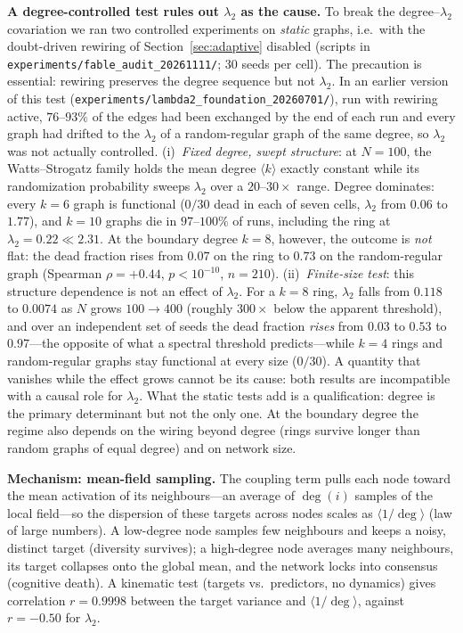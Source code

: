 ﻿\documentclass[11pt]{article}
\begin{document}
\textbf{A degree-controlled test rules out $\lambda_2$ as the cause.} To break the degree--$\lambda_2$ covariation we ran two controlled experiments on \emph{static} graphs, i.e.\ with the doubt-driven rewiring of Section~\ref{sec:adaptive} disabled (scripts in \texttt{experiments/fable\_audit\_20261111/}; 30 seeds per cell). The precaution is essential: rewiring preserves the degree sequence but not $\lambda_2$. In an earlier version of this test (\texttt{experiments/lambda2\_foundation\_20260701/}), run with rewiring active, $76$--$93\%$ of the edges had been exchanged by the end of each run and every graph had drifted to the $\lambda_2$ of a random-regular graph of the same degree, so $\lambda_2$ was not actually controlled. (i)~\emph{Fixed degree, swept structure}: at $N = 100$, the Watts--Strogatz family holds the mean degree $\langle k\rangle$ exactly constant while its randomization probability sweeps $\lambda_2$ over a $20$--$30\times$ range. Degree dominates: every $k=6$ graph is functional ($0/30$ dead in each of seven cells, $\lambda_2$ from $0.06$ to $1.77$), and $k=10$ graphs die in $97$--$100\%$ of runs, including the ring at $\lambda_2 = 0.22 \ll 2.31$. At the boundary degree $k=8$, however, the outcome is \emph{not} flat: the dead fraction rises from $0.07$ on the ring to $0.73$ on the random-regular graph (Spearman $\rho = +0.44$, $p < 10^{-10}$, $n = 210$). (ii)~\emph{Finite-size test}: this structure dependence is not an effect of $\lambda_2$. For a $k=8$ ring, $\lambda_2$ falls from $0.118$ to $0.0074$ as $N$ grows $100 \to 400$ (roughly $300\times$ below the apparent threshold), and over an independent set of seeds the dead fraction \emph{rises} from $0.03$ to $0.53$ to $0.97$---the opposite of what a spectral threshold predicts---while $k=4$ rings and random-regular graphs stay functional at every size ($0/30$). A quantity that vanishes while the effect grows cannot be its cause: both results are incompatible with a causal role for $\lambda_2$. What the static tests add is a qualification: degree is the primary determinant but not the only one. At the boundary degree the regime also depends on the wiring beyond degree (rings survive longer than random graphs of equal degree) and on network size.

\textbf{Mechanism: mean-field sampling.} The coupling term pulls each node toward the mean activation of its neighbours---an average of $\deg(i)$ samples of the local field---so the dispersion of these targets across nodes scales as $\langle 1/\deg\rangle$ (law of large numbers). A low-degree node samples few neighbours and keeps a noisy, distinct target (diversity survives); a high-degree node averages many neighbours, its target collapses onto the global mean, and the network locks into consensus (cognitive death). A kinematic test (targets vs.\ predictors, no dynamics) gives correlation $r = 0.9998$ between the target variance and $\langle 1/\deg\rangle$, against $r = -0.50$ for $\lambda_2$.
\end{document}
